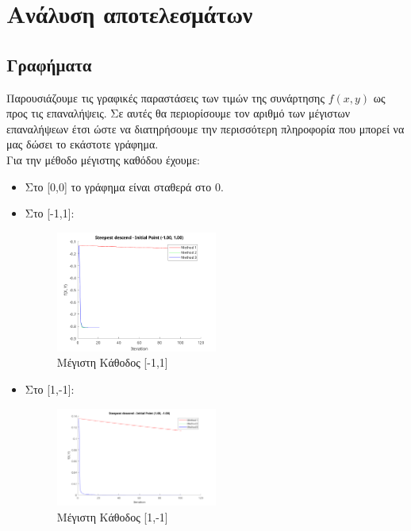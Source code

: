 \documentclass{report}
\begin{document}
\chapter{Ανάλυση αποτελεσμάτων}
\section{Γραφήματα}
Παρουσιάζουμε τις γραφικές παραστάσεις των τιμών της συνάρτησης $f(x,y)$ ως προς τις επαναλήψεις. 
Σε αυτές θα περιορίσουμε τον αριθμό των μέγιστων επαναλήψεων έτσι ώστε να διατηρήσουμε την περισσότερη
πληροφορία που μπορεί να μας δώσει το εκάστοτε γράφημα.\\ 
Για την μέθοδο μέγιστης καθόδου έχουμε:
\begin{itemize}
    \item Στο [0,0] το γράφημα είναι σταθερά στο 0.
    \item Στο [-1,1]:
    \begin{figure}[H]
        \centering
        \includegraphics[width=0.5\textwidth]{media/steep-11.png}
        \caption{Μέγιστη Κάθοδος [-1,1]}
    \end{figure}
    \item Στο [1,-1]:
    \begin{figure}[H]
        \centering
        \includegraphics[width=0.5\textwidth]{media/steep1-1.png}
        \caption{Μέγιστη Κάθοδος [1,-1]}
    \end{figure}
\end{itemize}
\end{document}
